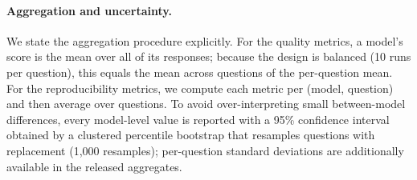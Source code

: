 \documentclass[11pt]{article}
\begin{document}
\paragraph{Aggregation and uncertainty.}
We state the aggregation procedure explicitly. For the quality metrics,
a model's score is the mean over all of its responses; because the
design is balanced (10 runs per question), this equals the mean across
questions of the per-question mean. For the reproducibility metrics, we
compute each metric per (model, question) and then average over
questions. To avoid over-interpreting small between-model differences,
every model-level value is reported with a 95\% confidence interval
obtained by a clustered percentile bootstrap that resamples questions
with replacement (1{,}000 resamples); per-question standard deviations
are additionally available in the released aggregates.
\end{document}
